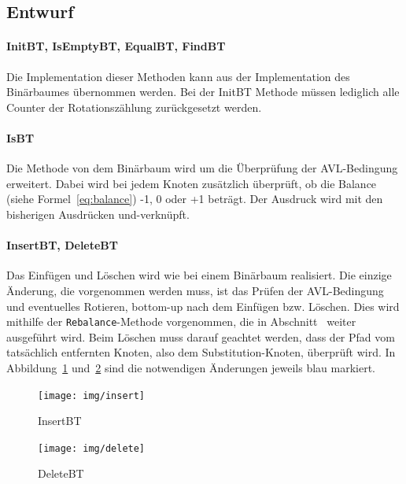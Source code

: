 
\subsection{Entwurf}\label{subsec:entwurf2}

\paragraph{InitBT, IsEmptyBT, EqualBT, FindBT}
Die Implementation dieser Methoden kann aus der Implementation des Binärbaumes übernommen werden.
Bei der InitBT Methode müssen lediglich alle Counter der Rotationszählung zurückgesetzt werden.

\paragraph{IsBT}\label{par:avl-isBT}
Die Methode von dem Binärbaum wird um die Überprüfung der AVL-Bedingung erweitert.
Dabei wird bei jedem Knoten zusätzlich überprüft, ob die Balance (siehe Formel~\ref{eq:balance})
-1, 0 oder +1 beträgt.
Der Ausdruck wird mit den bisherigen Ausdrücken und-verknüpft.

\paragraph{InsertBT, DeleteBT}
Das Einfügen und Löschen wird wie bei einem Binärbaum realisiert.
Die einzige Änderung, die vorgenommen werden muss, ist das Prüfen der
AVL-Bedingung und eventuelles Rotieren, bottom-up nach dem Einfügen bzw. Löschen.
Dies wird mithilfe der \verb|Rebalance|-Methode vorgenommen, die in
Abschnitt~ weiter ausgeführt wird.
Beim Löschen muss darauf geachtet werden, dass der Pfad vom tatsächlich entfernten Knoten, also
dem Substitution-Knoten, überprüft wird.
In Abbildung~\ref{fig:AVL-insert} und~\ref{fig:AVL-delete} sind die notwendigen Änderungen jeweils
blau markiert.

\begin{figure}[htbp]
    \centering
    \texttt{[image: img/insert]}
    \caption{InsertBT}
    \label{fig:AVL-insert}
\end{figure}
\begin{figure}[p]
    \centering
    \texttt{[image: img/delete]}
    \caption{DeleteBT}
    \label{fig:AVL-delete}
\end{figure}

